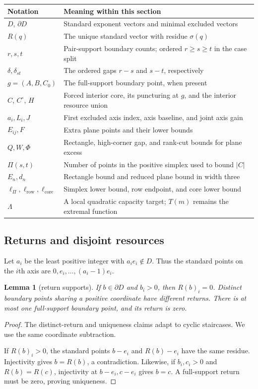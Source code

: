 \documentclass[11pt]{article}
\newtheorem{lemma}[theorem]{Lemma}
\theoremstyle{definition}
\theoremstyle{remark}
\theoremstyle{plain}
\begin{document}
\begin{center}
\begin{tabular}{@{}p{.21\linewidth}p{.72\linewidth}@{}}\toprule
Notation&Meaning within this section\\\midrule
$D$, $\partial D$&Standard exponent vectors and minimal excluded vectors\\
$R(q)$&The unique standard vector with residue $\sigma(q)$\\
$r,s,t$&Pair-support boundary counts; ordered $r\ge s\ge t$ in the case split\\
$\delta,\delta_{st}$&The ordered gaps $r-s$ and $s-t$, respectively\\
$g=(A,B,C_0)$&The full-support boundary point, when present\\
$C$, $C^\circ$, $H$&Forced interior core, its puncturing at $g$, and the interior resource union\\
$a_i,L_i,J$&First excluded axis index, axis baseline, and joint axis gain\\
$E_{ij},F$&Extra plane points and their lower bounds\\
$Q,W,\Phi$&Rectangle, high-corner gap, and rank-cut bounds for plane excess\\
$\Pi(s,t)$&Number of points in the positive simplex used to bound $|C|$\\
$E_n,d_n$&Rectangle bound and reduced plane bound in width three\\
$\ell_{\Pi},\ell_{\mathrm{row}},\ell_{\mathrm{core}}$&Simplex lower bound, row endpoint, and core lower bound\\
$\Lambda$&A local quadratic capacity target; $T(m)$ remains the extremal function\\\bottomrule
\end{tabular}
\end{center}

\subsection{Returns and disjoint resources}
Let $a_i$ be the least positive integer with $a_ie_i\notin D$.
Thus the standard points on the $i$th axis are $0,e_i,\ldots,(a_i-1)e_i$.
\begin{lemma}[return supports]\label{res:A.1}
If $b\in\partial D$ and $b_i>0$, then $R(b)_i=0$.
Distinct boundary points sharing a positive coordinate have different
returns. There is at most one full-support boundary point, and its return
is zero.
\end{lemma}
\begin{proof}
The distinct-return and uniqueness claims adapt
\cite[Proposition~5.2(a) and (c)]{BMO25} to cyclic staircases.
We use the same coordinate subtraction.

If $R(b)_i>0$, the standard points $b-e_i$ and $R(b)-e_i$ have the
same residue. Injectivity gives $b=R(b)$, a contradiction.
Likewise, if $b_i,c_i>0$ and $R(b)=R(c)$, injectivity at $b-e_i,c-e_i$
gives $b=c$. A full-support return must be zero, proving uniqueness.
\end{proof}
\end{document}
